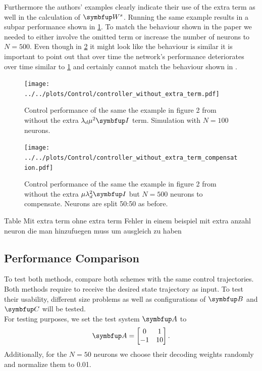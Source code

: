 Furthermore the authors' examples clearly indicate their use of the extra term as well in the calculation of $\bmu{W}^s$.
Running the same example results in a subpar performance shown in \cref{fig:bad_Ws}. To match the behaviour shown in the paper we needed to either involve the omitted term or increase the number of neurons to $N= 500$. Even though in \cref{fig:bad_Ws_compensated} it might look like the behaviour is similar it is important to point out that over time the network's performance deteriorates over time similar to \cref{fig:bad_Ws} and certainly cannot match the behaviour shown in \cite{huang_optimizing_2017}.
\begin{figure}[h!]
	\centering
	\texttt{[image: ../../plots/Control/controller\_without\_extra\_term.pdf]}
	\caption{Control performance of the same the example in figure 2 from \cite{huang_optimizing_2017} without the extra $\lambda_d\mu^2\bmu{I}$ term. Simulation with $N=100$ neurons.}
	\label{fig:bad_Ws}
\end{figure}

\begin{figure}[h!]
	\centering
	\texttt{[image: ../../plots/Control/controller\_without\_extra\_term\_compensation.pdf]}
	\caption{Control performance of the same the example in figure 2 from \cite{huang_optimizing_2017} without the extra $\mu\lambda_d^2\bmu{I}$ but $N=500$ neurons to compensate. Neurons are split 50:50 as before.}
	\label{fig:bad_Ws_compensated}
\end{figure}


Table
Mit extra term
ohne extra term
 Fehler in einem beispiel mit extra
 anzahl neuron die man hinzufuegen muss um ausgleich zu haben


\subsection{Performance Comparison}

To test both methods, compare both schemes with the same control trajectories.\\
Both methods require to receive the desired state trajectory as input. To test their usability, different size problems as well as configurations of $\bmu{B}$ and $\bmu{C}$ will be tested.\\
For testing purposes, we set the test system $\bmu{A}$ to
\begin{equation}
	\bmu{A} = \begin{bmatrix}0 & 1\\-1 & 10\\\end{bmatrix}.
\end{equation}
Additionally, for the $N=50$ neurons we choose their decoding weights randomly and normalize them to 0.01.

